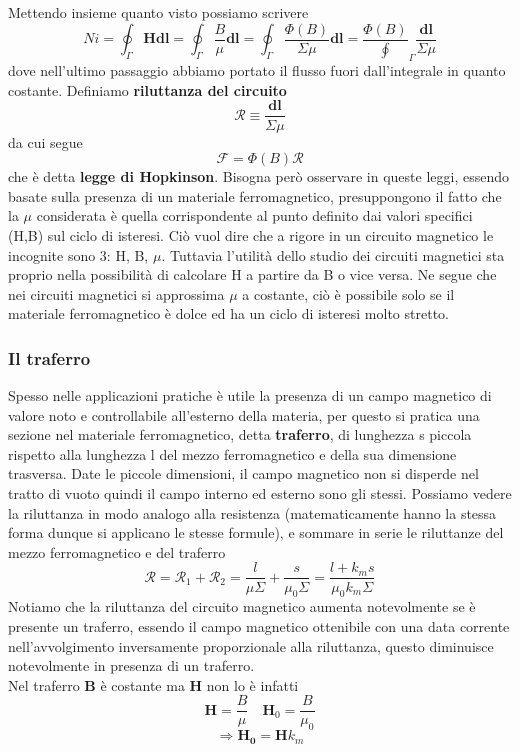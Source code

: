 \documentclass[
10pt, %
a4paper, %
oneside, %
headinclude,footinclude, %
BCOR5mm, %
]{scrartcl}
\begin{document}
Mettendo insieme quanto visto possiamo scrivere
\[Ni = \oint_{\Gamma}\mathbf{H}\mathbf{dl} = \oint_{\Gamma}\frac{B}{\mu}\mathbf{dl}=\oint_{\Gamma}\frac{\Phi(B)}{\Sigma\mu}\mathbf{dl} =\frac{\Phi(B)}\oint_{\Gamma}\frac{\mathbf{dl}}{\Sigma\mu}\]
dove nell'ultimo passaggio abbiamo portato il flusso fuori dall'integrale in quanto costante. Definiamo \textbf{riluttanza del circuito}
\[\mathcal{R}\equiv\frac{\mathbf{dl}}{\Sigma\mu} \]
da cui segue
\[\mathcal{F}=\Phi(B)\mathcal{R}\]
che è detta \textbf{legge di Hopkinson}. Bisogna però osservare in queste leggi, essendo basate sulla presenza di un materiale ferromagnetico, presuppongono il fatto che la $\mu$ considerata è quella corrispondente al punto definito dai valori specifici (H,B) sul ciclo di isteresi. Ciò vuol dire che a rigore in un circuito magnetico le incognite sono 3: H, B, $\mu$. Tuttavia l'utilità dello studio dei circuiti magnetici sta proprio nella possibilità di calcolare H a partire da B o vice versa. Ne segue che nei circuiti magnetici si approssima $\mu$ a costante, ciò è possibile solo se il materiale ferromagnetico è dolce ed ha un ciclo di isteresi molto stretto. 
\subsubsection*{Il traferro}
Spesso nelle applicazioni pratiche è utile la presenza di un campo magnetico di valore noto e controllabile all'esterno della materia, per questo si pratica una sezione nel materiale ferromagnetico, detta \textbf{traferro}, di lunghezza s piccola rispetto alla lunghezza l del mezzo ferromagnetico e della sua dimensione trasversa. Date le piccole dimensioni, il campo magnetico non si disperde nel tratto di vuoto quindi il campo interno ed esterno sono gli stessi. Possiamo vedere la riluttanza in modo analogo alla resistenza (matematicamente hanno la stessa forma dunque si applicano le stesse formule), e sommare in serie le riluttanze del mezzo ferromagnetico e del traferro
\[\mathcal{R} = \mathcal{R}_1 + \mathcal{R}_2 = \frac{l}{\mu \Sigma}+\frac{s}{\mu_0\Sigma} = \frac{l+k_m s}{\mu_0 k_m\Sigma}\]
Notiamo che la riluttanza del circuito magnetico aumenta notevolmente se è presente un traferro, essendo il campo magnetico ottenibile con una data corrente nell'avvolgimento inversamente proporzionale alla riluttanza, questo diminuisce notevolmente in presenza di un traferro.\\
Nel traferro \(\mathbf{B}\) è costante ma \(\mathbf{H}\) non lo è infatti
\[\mathbf{H} = \frac{B}{\mu}\quad \mathbf{H}_0 = \frac{B}{\mu_0}\]
\[\Rightarrow \mathbf{H_0} = \mathbf{H}k_m\]
\end{document}
